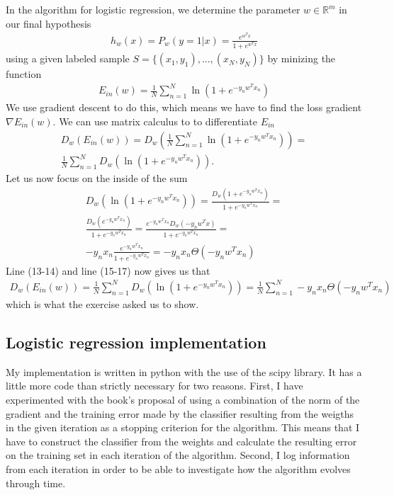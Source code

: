 In the algorithm for logistic regression, we determine the parameter $w \in \mathbb{R}^m$ in our final hypothesis
\begin{align}
h_w(x) = P_w(y = 1|x) = \frac{e^{w^Tx}}{1 + e^{w^Tx}}
\end{align}
using a given labeled sample $S = \{(x_1,y_1),...,(x_N,y_N)\}$ by minizing the function
\begin{align}
E_{in}(w) = \frac{1}{N} \sum_{n=1}^N \ln(1 + e^{-y_n w^T x_n})
\end{align}
We use gradient descent to do this, which means we have to find the loss gradient $\nabla E_{in}(w)$. We can use matrix calculus to to differentiate $E_{in}$
\begin{align}
D_w (E_{in}(w)) = D_w\left( \frac{1}{N} \sum_{n=1}^N \ln(1 + e^{-y_n w^T x_n}) \right) = \\ 
 \frac{1}{N} \sum_{n=1}^N D_w \left( \ln(1 + e^{-y_n w^T x_n}) \right). 
\end{align}
Let us now focus on the inside of the sum
\begin{align}
D_w \left( \ln(1 + e^{-y_n w^T x_n}) \right) = \frac{D_w ( 1 + e^{-y_n w^T x_n})}{1 + e^{-y_n w^T x_n}} = \\ 
\frac{D_w (e^{-y_n w^T x_n})}{1 + e^{-y_n w^T x_n}} =
\frac{e^{-y_n w^T x_n} D_w(-y_nw^Tx)}{1 + e^{-y_n w^T x_n}} = \\ 
-y_n x_n \frac{e^{-y_n w^T x_n}}{1 + e^{-y_n w^T x_n}} = -y_n x_n \Theta(-y_n w^T x_n)
\end{align}
Line (13-14) and line (15-17) now gives us that
\begin{align}
D_w (E_{in}(w)) =  \frac{1}{N} \sum_{n=1}^N D_w \left( \ln(1 + e^{-y_n w^T x_n}) \right) =
\frac{1}{N} \sum_{n=1}^N  -y_n x_n \Theta(-y_n w^T x_n) 
\end{align}
which is what the exercise asked us to show. 

\subsection{Logistic regression implementation}

My implementation is written in python with the use of the scipy library. It has a little more code than strictly necessary for two reasons. First, I have experimented with the book's proposal of using a combination of the norm of the gradient and the training error made by the classifier resulting from the weigths in the given iteration as a stopping criterion for the algorithm. This means that I have to construct the classifier from the weights and calculate the resulting error on the training set in each iteration of the algorithm. Second, I log information from each iteration in order to be able to investigate how the algorithm evolves through time. 

